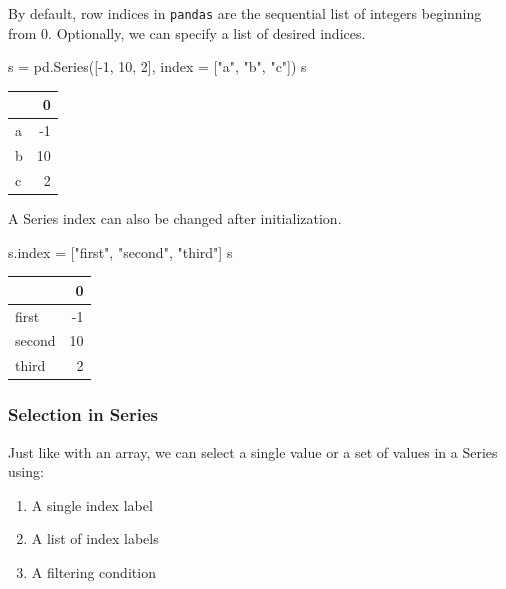\documentclass[
  letterpaper,
  DIV=11,
  numbers=noendperiod]{scrreprt}
\newenvironment{Shaded}{\begin{snugshade}}{\end{snugshade}}
\newcommand{\DecValTok}[1]{\textcolor[rgb]{0.68,0.00,0.00}{#1}}
\newcommand{\NormalTok}[1]{\textcolor[rgb]{0.00,0.23,0.31}{#1}}
\newcommand{\OperatorTok}[1]{\textcolor[rgb]{0.37,0.37,0.37}{#1}}
\newcommand{\StringTok}[1]{\textcolor[rgb]{0.13,0.47,0.30}{#1}}
\providecommand{\tightlist}{%
  \setlength{\itemsep}{0pt}\setlength{\parskip}{0pt}}\usepackage{longtable,booktabs,array}
\begin{document}
By default, row indices in \texttt{pandas} are the sequential list of
integers beginning from 0. Optionally, we can specify a list of desired
indices.

\begin{Shaded}
\begin{Highlighting}[]
\NormalTok{s }\OperatorTok{=}\NormalTok{ pd.Series([}\OperatorTok{{-}}\DecValTok{1}\NormalTok{, }\DecValTok{10}\NormalTok{, }\DecValTok{2}\NormalTok{], index }\OperatorTok{=}\NormalTok{ [}\StringTok{"a"}\NormalTok{, }\StringTok{"b"}\NormalTok{, }\StringTok{"c"}\NormalTok{])}
\NormalTok{s}
\end{Highlighting}
\end{Shaded}

\begin{tabular}{lr}
\toprule
{} &   0 \\
\midrule
a &  -1 \\
b &  10 \\
c &   2 \\
\bottomrule
\end{tabular}

A Series index can also be changed after initialization.

\begin{Shaded}
\begin{Highlighting}[]
\NormalTok{s.index }\OperatorTok{=}\NormalTok{ [}\StringTok{"first"}\NormalTok{, }\StringTok{"second"}\NormalTok{, }\StringTok{"third"}\NormalTok{]}
\NormalTok{s}
\end{Highlighting}
\end{Shaded}

\begin{tabular}{lr}
\toprule
{} &   0 \\
\midrule
first  &  -1 \\
second &  10 \\
third  &   2 \\
\bottomrule
\end{tabular}

\hypertarget{selection-in-series}{%
\subsubsection{Selection in Series}\label{selection-in-series}}

Just like with an array, we can select a single value or a set of values
in a Series using:

\begin{enumerate}
\def\labelenumi{\arabic{enumi}.}
\tightlist
\item
  A single index label
\item
  A list of index labels
\item
  A filtering condition
\end{enumerate}
\end{document}
